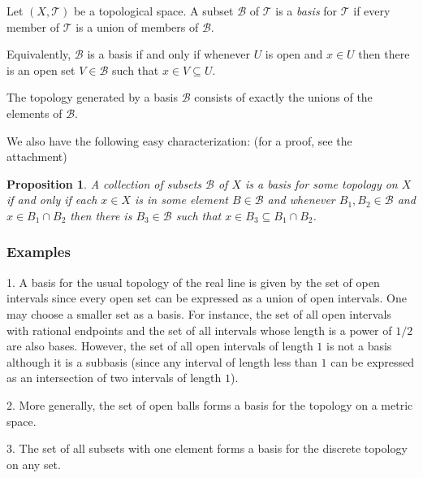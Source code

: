 \documentclass{article}
\newtheorem*{proposition}{Proposition}
\begin{document}
Let $(X,\mathcal{T})$ be a topological space.  A subset $\mathcal{B}$ of 
$\mathcal{T}$ is a \emph{basis} for $\mathcal{T}$ if every member of $\mathcal{T}$ is a union of members of $\mathcal{B}$.

Equivalently, $\mathcal{B}$ is a basis if and only if whenever $U$ is open and $x\in U$ then there is an open set $V \in \mathcal{B}$ such that $x\in V\subseteq U$.

The topology generated by a basis $\mathcal{B}$ consists of exactly the unions of the elements of $\mathcal{B}$.

We also have the following easy characterization: (for a proof, see the attachment)

\begin{proposition}
A collection of subsets $\mathcal{B}$ of $X$ is a basis for some topology on $X$ if and only if each $x \in X$ is in some element $B \in \mathcal{B}$ and whenever $B_1, B_2\in\mathcal{B}$ and $x\in B_1\cap B_2$ then there is $B_3\in\mathcal{B}$ such that $x\in B_3\subseteq B_1\cap B_2$.
\end{proposition}

\subsubsection{Examples}

1. A basis for the usual topology of the real line is given by the set of open intervals since every open set can be expressed as a union of open intervals.  One may choose a smaller set as a basis.  For instance, the set of all open intervals with rational endpoints and the set of all intervals whose length is a power of $1/2$ are also bases.  However, the set of all open intervals of length $1$ is not a basis although it is a subbasis (since any interval of length less than $1$ can be expressed as an intersection of two intervals of length $1$).

2. More generally, the set of open balls forms a basis for the topology on a metric space.

3.  The set of all subsets with one element forms a basis for the discrete topology on any set.
\end{document}
